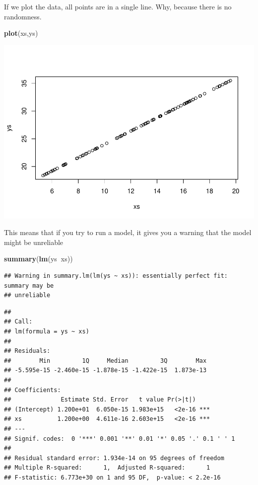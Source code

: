 \documentclass[
]{book}
\newenvironment{Shaded}{\begin{snugshade}}{\end{snugshade}}
\newcommand{\KeywordTok}[1]{\textcolor[rgb]{0.13,0.29,0.53}{\textbf{#1}}}
\newcommand{\NormalTok}[1]{#1}
\newcommand{\OperatorTok}[1]{\textcolor[rgb]{0.81,0.36,0.00}{\textbf{#1}}}
\begin{document}
If we plot the data, all points are in a single line. Why, because there is no randomness.

\begin{Shaded}
\begin{Highlighting}[]
\KeywordTok{plot}\NormalTok{(xs,ys)}
\end{Highlighting}
\end{Shaded}

\includegraphics{ECOMODbook_files/figure-latex/a6.23-1.pdf}

This means that if you try to run a model, it gives you a warning that the model might be unreliable

\begin{Shaded}
\begin{Highlighting}[]
\KeywordTok{summary}\NormalTok{(}\KeywordTok{lm}\NormalTok{(ys}\OperatorTok{~}\NormalTok{xs))}
\end{Highlighting}
\end{Shaded}

\begin{verbatim}
## Warning in summary.lm(lm(ys ~ xs)): essentially perfect fit: summary may be
## unreliable
\end{verbatim}

\begin{verbatim}
## 
## Call:
## lm(formula = ys ~ xs)
## 
## Residuals:
##        Min         1Q     Median         3Q        Max 
## -5.595e-15 -2.460e-15 -1.878e-15 -1.422e-15  1.873e-13 
## 
## Coefficients:
##              Estimate Std. Error   t value Pr(>|t|)    
## (Intercept) 1.200e+01  6.050e-15 1.983e+15   <2e-16 ***
## xs          1.200e+00  4.611e-16 2.603e+15   <2e-16 ***
## ---
## Signif. codes:  0 '***' 0.001 '**' 0.01 '*' 0.05 '.' 0.1 ' ' 1
## 
## Residual standard error: 1.934e-14 on 95 degrees of freedom
## Multiple R-squared:      1,	Adjusted R-squared:      1 
## F-statistic: 6.773e+30 on 1 and 95 DF,  p-value: < 2.2e-16
\end{verbatim}
\end{document}
